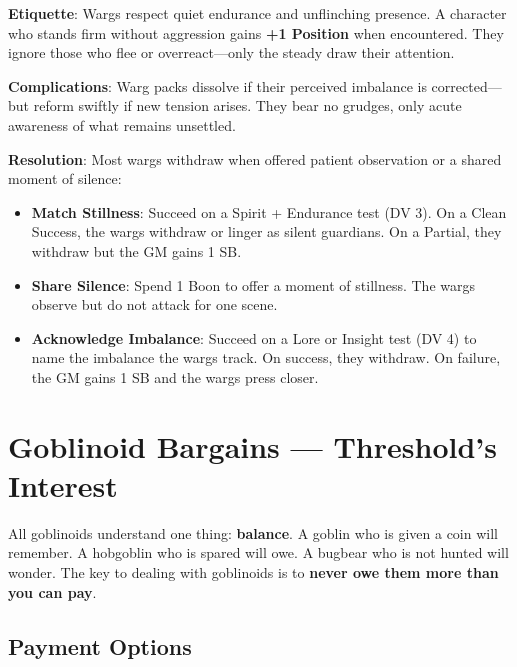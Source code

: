 \textbf{Etiquette}: Wargs respect quiet endurance and unflinching presence. A character who stands firm without aggression gains \textbf{+1 Position} when encountered. They ignore those who flee or overreact---only the steady draw their attention.

\textbf{Complications}: Warg packs dissolve if their perceived imbalance is corrected---but reform swiftly if new tension arises. They bear no grudges, only acute awareness of what remains unsettled.

\textbf{Resolution}: Most wargs withdraw when offered patient observation or a shared moment of silence:
\begin{itemize}
    \item \textbf{Match Stillness}: Succeed on a Spirit + Endurance test (DV 3). On a Clean Success, the wargs withdraw or linger as silent guardians. On a Partial, they withdraw but the GM gains 1 SB.
    \item \textbf{Share Silence}: Spend 1 Boon to offer a moment of stillness. The wargs observe but do not attack for one scene.
    \item \textbf{Acknowledge Imbalance}: Succeed on a Lore or Insight test (DV 4) to name the imbalance the wargs track. On success, they withdraw. On failure, the GM gains 1 SB and the wargs press closer.
\end{itemize}

\section{Goblinoid Bargains --- Threshold's Interest}

All goblinoids understand one thing: \textbf{balance}. A goblin who is given a coin will remember. A hobgoblin who is spared will owe. A bugbear who is not hunted will wonder. The key to dealing with goblinoids is to \textbf{never owe them more than you can pay}.

\subsection{Payment Options}

